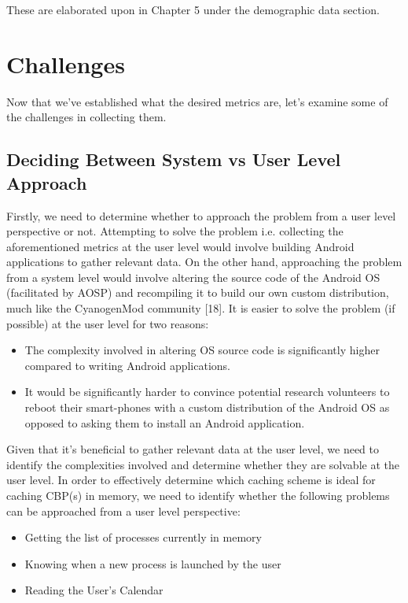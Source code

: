 \documentclass[12pt]{uthesis-v12}  %
\begin{document}
			These are elaborated upon in Chapter 5 under the demographic data section.   
			
	\section{Challenges}
		Now that we've established what the desired metrics are, let's examine some of the challenges in collecting them.  
		
		\subsection{Deciding Between System vs User Level Approach}
			Firstly, we need to determine whether to approach the problem from a user level perspective or not. Attempting to solve the problem i.e. collecting the aforementioned metrics at the user level would involve building Android applications to gather relevant data. On the other hand, approaching the problem from a system level would involve altering the source code of the Android OS (facilitated by AOSP) and recompiling it to build our own custom distribution, much like the CyanogenMod community [18]. It is easier to solve the problem (if possible) at the user level for two reasons:
			
			\begin{itemize}
				\item The complexity involved in altering OS source code is significantly higher compared to writing Android applications.
				\item It would be significantly harder to convince potential research volunteers to reboot their smart-phones with a custom distribution of the Android OS as opposed to asking them to install an Android application.
			\end{itemize}
			
			Given that it's beneficial to gather relevant data at the user level, we need to identify the complexities involved and determine whether they are solvable at the user level. In order to effectively determine which caching scheme is ideal for caching CBP(s) in memory, we need to identify whether the following problems can be approached from a user level perspective:
			
			\begin{itemize}
				\item Getting the list of processes currently in memory \checkmark
				\item Knowing when a new process is launched by the user \checkmark
				\item Reading the User's Calendar \checkmark
			\end{itemize} 
			
\end{document}
